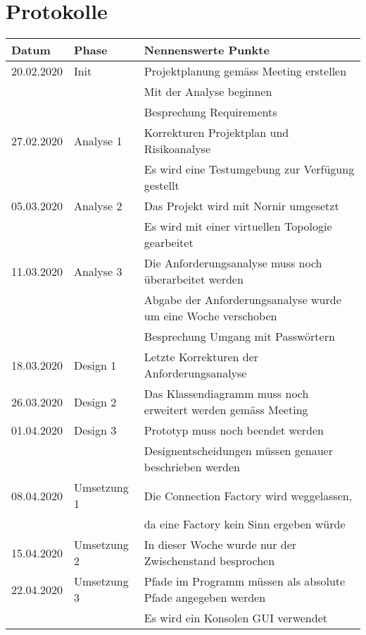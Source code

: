 \documentclass[]{subfiles}
\begin{document}
\section{Protokolle}
    \begin{tabularx}{\linewidth}{lll}
        \toprule
        Datum & Phase & Nennenswerte Punkte \\
        \midrule
        20.02.2020 & Init & Projektplanung gemäss Meeting erstellen \\
        & & Mit der Analyse beginnen \\
        & & Besprechung Requirements \\
        \midrule
        27.02.2020 & Analyse 1 & Korrekturen Projektplan und Risikoanalyse \\
        & & Es wird eine Testumgebung zur Verfügung gestellt \\
        \midrule
        05.03.2020 & Analyse 2 & Das Projekt wird mit Nornir umgesetzt \\
        & & Es wird mit einer virtuellen Topologie gearbeitet\\
        \midrule
        11.03.2020 & Analyse 3 & Die Anforderungsanalyse muss noch überarbeitet werden \\
        & & Abgabe der Anforderungsanalyse wurde um eine Woche verschoben \\
        & & Besprechung Umgang mit Passwörtern \\
        \midrule
        18.03.2020 & Design 1 & Letzte Korrekturen der Anforderungsanalyse \\
        \midrule
        26.03.2020 & Design 2 & Das Klassendiagramm muss noch erweitert werden gemäss Meeting \\
        \midrule
        01.04.2020 & Design 3 & Prototyp muss noch beendet werden \\
        & & Designentscheidungen müssen genauer beschrieben werden \\
        \midrule
        08.04.2020 & Umsetzung 1 & Die Connection Factory wird weggelassen,\\
        & & da eine Factory kein Sinn ergeben würde \\
        \midrule
        15.04.2020 & Umsetzung 2 & In dieser Woche wurde nur der Zwischenstand besprochen \\
        \midrule
        22.04.2020 & Umsetzung 3 & Pfade im Programm müssen als absolute Pfade angegeben werden \\
        & & Es wird ein Konsolen GUI verwendet \\

\end{tabularx}
\end{document}
